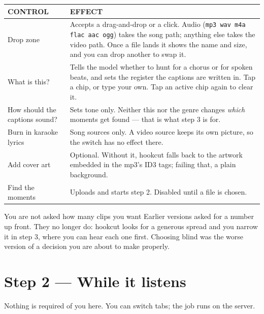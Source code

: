 \documentclass[11pt,a4paper]{article}
\newcommand{\code}[1]{\texttt{\small #1}}
\begin{document}
\begin{tabularx}{\linewidth}{@{}p{3.4cm} X@{}}
\toprule
{\sffamily\footnotesize\color{muted}CONTROL} &
{\sffamily\footnotesize\color{muted}EFFECT} \\
\midrule
Drop zone &
\small Accepts a drag-and-drop or a click. Audio (\code{mp3 wav m4a flac aac ogg})
takes the song path; anything else takes the video path. Once a file lands it
shows the name and size, and you can drop another to swap it. \\[4pt]

What is this? &
\small Tells the model whether to hunt for a chorus or for spoken beats, and
sets the register the captions are written in. Tap a chip, or type your own.
Tap an active chip again to clear it. \\[4pt]

How should the captions sound? &
\small Sets tone only. Neither this nor the genre changes \textit{which}
moments get found --- that is what step 3 is for. \\[4pt]

Burn in karaoke lyrics &
\small Song sources only. A video source keeps its own picture, so the switch
has no effect there. \\[4pt]

Add cover art &
\small Optional. Without it, hookcut falls back to the artwork embedded in the
mp3's ID3 tags; failing that, a plain background. \\[4pt]

Find the moments &
\small Uploads and starts step 2. Disabled until a file is chosen. \\
\bottomrule
\end{tabularx}

\begin{note}{You are not asked how many clips you want}
Earlier versions asked for a number up front. They no longer do: hookcut looks
for a generous spread and you narrow it in step 3, where you can hear each one
first. Choosing blind was the worse version of a decision you are about to make
properly.
\end{note}

\section{Step 2 --- While it listens}

Nothing is required of you here. You can switch tabs; the job runs on the
server.
\end{document}
